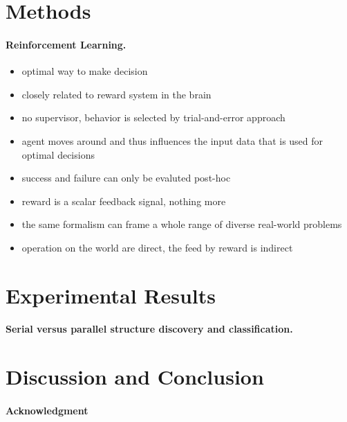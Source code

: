 \documentclass{article} %
\begin{document}
\section{Methods}
%
\paragraph{Reinforcement Learning.}
\begin{itemize}
\item optimal way to make decision
\item closely related to reward system in the brain
\item no supervisor, behavior is selected by trial-and-error approach
\item agent moves around and thus influences the input data that is used for optimal decisions
\item success and failure can only be evaluted post-hoc
\item reward is a scalar feedback signal, nothing more
\item the same formalism can frame a whole range of diverse real-world problems
\item operation on the world are direct, the feed by reward is indirect

\end{itemize}
 

\section{Experimental Results}
\paragraph{Serial versus parallel structure discovery and classification.}


\section{Discussion and Conclusion}



\paragraph{Acknowledgment}

\small


\end{document}
